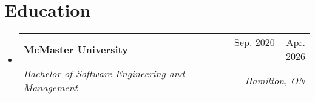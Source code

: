 \documentclass[letterpaper,11pt]{article}
\makeatletter
\newcommand{\resumeSubheading}[4]{
  \vspace{-2pt}\item
    \begin{tabular*}{0.97\textwidth}[t]{l@{\extracolsep{\fill}}r}
      \textbf{#1} & #2 \\
      \textit{\small#3} & \textit{\small #4} \\
    \end{tabular*}\vspace{-7pt}
}
\newcommand{\resumeSubHeadingListStart}{\begin{itemize}[leftmargin=0.15in, label={}]}
\newcommand{\resumeSubHeadingListEnd}{\end{itemize}}
\makeatother
\begin{document}
\section{Education}
  \resumeSubHeadingListStart
    \resumeSubheading
      {McMaster University}{Sep. 2020 -- Apr. 2026}
      {Bachelor of Software Engineering and Management}{Hamilton, ON}
  \resumeSubHeadingListEnd
\end{document}
